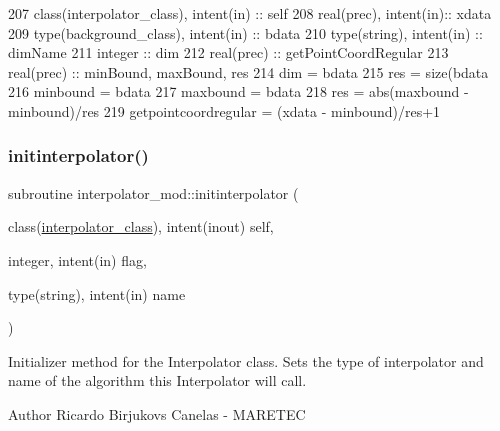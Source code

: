 \begin{DoxyCode}
207     \textcolor{keywordtype}{class}(interpolator\_class), \textcolor{keywordtype}{intent(in)} :: self
208     \textcolor{keywordtype}{real(prec)}, \textcolor{keywordtype}{intent(in)}:: xdata
209     \textcolor{keywordtype}{type}(background\_class), \textcolor{keywordtype}{intent(in)} :: bdata
210     \textcolor{keywordtype}{type}(string), \textcolor{keywordtype}{intent(in)} :: dimName
211     \textcolor{keywordtype}{integer} :: dim
212     \textcolor{keywordtype}{real(prec)} :: getPointCoordRegular
213     \textcolor{keywordtype}{real(prec)} :: minBound, maxBound, res
214     dim = bdata%
215     res = \textcolor{keyword}{size}(bdata%
216     minbound = bdata%
217     maxbound = bdata%
218     res = abs(maxbound - minbound)/res
219     getpointcoordregular = (xdata - minbound)/res+1
\end{DoxyCode}
\mbox{\label{namespaceinterpolator__mod_adcaf3bba800f19991ed4f33c968184e9}} 
\subsubsection{\texorpdfstring{initinterpolator()}{initinterpolator()}}
{\footnotesize\ttfamily subroutine interpolator\+\_\+mod\+::initinterpolator (\begin{DoxyParamCaption}\item[{class(\mbox{\hyperlink{structinterpolator__mod_1_1interpolator__class}{interpolator\+\_\+class}}), intent(inout)}]{self,  }\item[{integer, intent(in)}]{flag,  }\item[{type(string), intent(in)}]{name }\end{DoxyParamCaption})\hspace{0.3cm}{\ttfamily [private]}}



Initializer method for the Interpolator class. Sets the type of interpolator and name of the algorithm this Interpolator will call. 

\begin{DoxyAuthor}{Author}
Ricardo Birjukovs Canelas -\/ M\+A\+R\+E\+T\+EC 
\end{DoxyAuthor}

